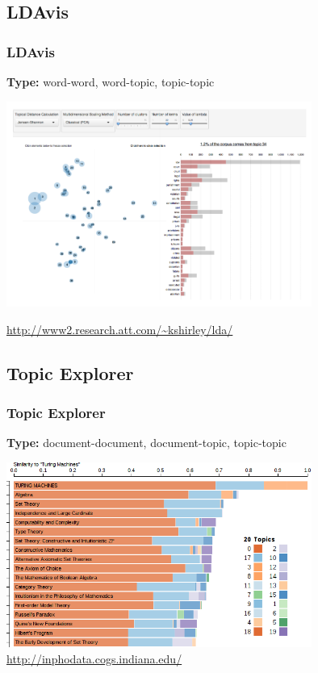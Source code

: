 \documentclass[t]{beamer}
\begin{document}
\subsection{LDAvis}
\begin{frame}
\frametitle{LDAvis}
\textbf{Type:} word-word, word-topic, topic-topic

\includegraphics[width=0.75\textwidth]{img/ldavis.png}


\url{http://www2.research.att.com/~kshirley/lda/}

\cite{Sievert2014}
\end{frame}

\subsection{Topic Explorer}
\begin{frame}
\frametitle{Topic Explorer}
\textbf{Type:} document-document, document-topic, topic-topic

\includegraphics[width=0.75\textwidth]{img/topex20.png}
\url{http://inphodata.cogs.indiana.edu/}

\cite{aaai2015}
\end{frame}
\end{document}
